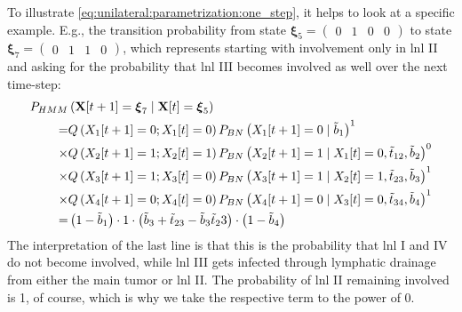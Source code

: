 \documentclass[\relativeRoot/main.tex]{subfiles}
\begin{document}
To illustrate \cref{eq:unilateral:parametrization:one_step}, it helps to look at a specific example. E.g., the transition probability from state $\boldsymbol{\xi}_5 = \begin{pmatrix} 0 & 1 & 0 & 0 \end{pmatrix}$ to state $\boldsymbol{\xi}_7 = \begin{pmatrix} 0 & 1 & 1 & 0 \end{pmatrix}$, which represents starting with involvement only in \gls{lnl} II and asking for the probability that \gls{lnl} III becomes involved as well over the next time-step:
%
\begin{equation}
    \begin{aligned}
        P_{HMM} &\left( \mathbf{X}[t+1] = \boldsymbol{\xi}_7 \mid \mathbf{X}[t] = \boldsymbol{\xi}_5 \right) \\
        = &Q \left( X_1[t+1] = 0; X_1[t] = 0 \right) P_{BN} \left( X_1[t+1] = 0 \mid \Tilde{b}_1 \right)^1 \\
        \times &Q \left( X_2[t+1] = 1; X_2[t] = 1 \right) P_{BN} \left( X_2[t+1] = 1 \mid X_1[t] = 0, \Tilde{t}_{12}, \Tilde{b}_2 \right)^0 \\
        \times &Q \left( X_3[t+1] = 1; X_3[t] = 0 \right) P_{BN} \left( X_3[t+1] = 1 \mid X_2[t] = 1, \Tilde{t}_{23}, \Tilde{b}_3 \right)^1 \\
        \times &Q \left( X_4[t+1] = 0; X_4[t] = 0 \right) P_{BN} \left( X_4[t+1] = 0 \mid X_3[t] = 0, \Tilde{t}_{34}, \Tilde{b}_4 \right)^1 \\
        = &\left( 1 - \Tilde{b}_1 \right) \cdot 1 \cdot \left( \Tilde{b}_3 + \Tilde{t}_{23} - \Tilde{b}_3 \Tilde{t}_23 \right) \cdot \left( 1 - \Tilde{b}_4 \right)
    \end{aligned}
\end{equation}
%
The interpretation of the last line is that this is the probability that \gls{lnl} I and IV do not become involved, while \gls{lnl} III gets infected through lymphatic drainage from either the main tumor or \gls{lnl} II. The probability of \gls{lnl} II remaining involved is 1, of course, which is why we take the respective term to the power of 0.
\end{document}
